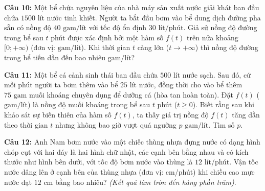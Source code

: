 \documentclass[12pt]{article}
\begin{document}
\begin{center}
	\end{center}
	
	
	
	\noindent \textbf{Câu 10:} Một bể chứa nguyên liệu của nhà máy sản xuất nước giải khát ban đầu chứa $1500$ lít nước tinh khiết. Người ta bắt đầu bơm vào bể dung dịch đường pha sẵn có nồng độ $40\text{ gam/lít}$ với tốc độ ổn định $30\text{ lít/phút}$. Giả sử nồng độ đường trong bể sau $t$ phút được xác định bởi một hàm số $f(t)$ trên nửa khoảng $[0; +\infty)$ (đơn vị: $\text{gam/lít}$). Khi thời gian $t$ càng lớn ($t \to +\infty$) thì nồng độ đường trong bể tiến dần đến bao nhiêu $\text{gam/lít}$?
	
	\vspace{0.5cm}
	
	\noindent \textbf{Câu 11:} Một bể cá cảnh sinh thái ban đầu chứa $500$ lít nước sạch. Sau đó, cứ mỗi phút người ta bơm thêm vào bể $25$ lít nước, đồng thời cho vào bể thêm $75\text{ gam}$ muối khoáng chuyên dụng để dưỡng cá (hòa tan hoàn toàn). Đặt $f(t)$ ($\text{gam/lít}$) là nồng độ muối khoáng trong bể sau $t$ phút ($t \ge 0$). Biết rằng sau khi khảo sát sự biến thiên của hàm số $f(t)$, ta thấy giá trị nồng độ $f(t)$ tăng dần theo thời gian $t$ nhưng không bao giờ vượt quá ngưỡng $p\text{ gam/lít}$. Tìm số $p$.
	
	\vspace{0.6cm}
	\noindent \textbf{Câu 12:} Anh Nam bơm nước vào một chiếc thùng nhựa đựng nước có dạng hình chóp cụt với hai đáy là hai hình chữ nhật, các cạnh bên bằng nhau và có kích thước như hình bên dưới, với tốc độ bơm nước vào thùng là $12$ lít/phút. Vận tốc nước dâng lên ở cạnh bên của thùng nhựa (đơn vị: cm/phút) khi chiều cao mực nước đạt $12\text{ cm}$ bằng bao nhiêu? \textit{(Kết quả làm tròn đến hàng phần trăm)}.
	
\end{document}
